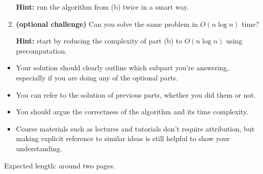 \documentclass[12pt]{article}
\begin{document}
\begin{question}
\begin{enumerate}[label = (\alph*)]
\begin{center}
    \end{center}

    \textbf{Hint:} run the algorithm from (b) twice in a smart way.

    \item \textbf{(optional challenge)} Can you solve the same problem in $O(n\log n)$ time?

    \textbf{Hint:} start by reducing the complexity of part (b) to $O(n \log n)$ using precomputation.
\end{enumerate}
\end{question}

\begin{rubric}
\begin{itemize}
    \item Your solution should clearly outline which subpart you're answering, especially if you are doing any of the optional parts.

    \item You can refer to the solution of previous parts, whether you did them or not.

    \item You should argue the correctness of the algorithm and its time complexity.

    \item Course materials such as lectures and tutorials don't require attribution, but making explicit reference to similar ideas is still helpful to show your understanding.
\end{itemize}

Expected length: around two pages.
\end{rubric}

\begin{solution}
\end{solution}

\begin{attribution}
\end{attribution}
\end{document}
